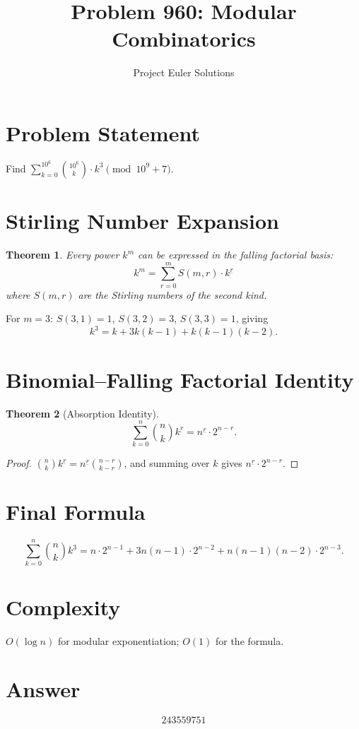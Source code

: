 \documentclass[11pt]{article}
\title{Problem 960: Modular Combinatorics}
\author{Project Euler Solutions}
\date{}
\newtheorem{theorem}{Theorem}
\begin{document}
\maketitle

\section{Problem Statement}

Find $\displaystyle\sum_{k=0}^{10^6} \binom{10^6}{k} \cdot k^3 \pmod{10^9+7}$.

\section{Stirling Number Expansion}

\begin{theorem}
Every power $k^m$ can be expressed in the falling factorial basis:
\[
k^m = \sum_{r=0}^{m} S(m,r) \cdot k^{\underline{r}}
\]
where $S(m,r)$ are the Stirling numbers of the second kind.
\end{theorem}

For $m=3$: $S(3,1)=1$, $S(3,2)=3$, $S(3,3)=1$, giving
\[
k^3 = k + 3k(k{-}1) + k(k{-}1)(k{-}2).
\]

\section{Binomial--Falling Factorial Identity}

\begin{theorem}[Absorption Identity]
\[
\sum_{k=0}^{n} \binom{n}{k} k^{\underline{r}} = n^{\underline{r}} \cdot 2^{n-r}.
\]
\end{theorem}

\begin{proof}
$\binom{n}{k} k^{\underline{r}} = n^{\underline{r}} \binom{n-r}{k-r}$, and summing over $k$ gives $n^{\underline{r}} \cdot 2^{n-r}$.
\end{proof}

\section{Final Formula}

\[
\sum_{k=0}^{n}\binom{n}{k}k^3 = n \cdot 2^{n-1} + 3n(n{-}1) \cdot 2^{n-2} + n(n{-}1)(n{-}2) \cdot 2^{n-3}.
\]

\section{Complexity}

$O(\log n)$ for modular exponentiation; $O(1)$ for the formula.

\section{Answer}

\[
\boxed{243559751}
\]
\end{document}
